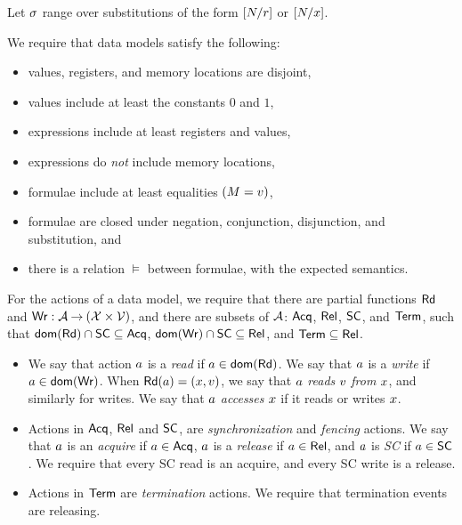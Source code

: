Let $\sigma$ range over substitutions of the form
$[N/r]$ or $[N/x]$.

We require that data models satisfy the following:
\begin{itemize}
\item values, registers, and memory locations are disjoint,
\item values include at least the constants $0$ and $1$,
\item expressions include at least registers and values,
\item expressions do \emph{not} include memory locations, %
\item formulae include at least %
  equalities %
  $(M=v)$, %
\item formulae are closed under negation, conjunction, disjunction, and
  substitution, and
\item there is a relation $\vDash$ between formulae, with the expected semantics.
\end{itemize}

For the actions of a data model, we require that
there are partial functions $\mathsf{Rd}$ and
$\mathsf{Wr}: \mathcal{A} \mathbin\rightarrow (\mathcal{X} \times \mathcal{V})$, and there are subsets of $\mathcal{A}$:
$\mathsf{Acq}$, $\mathsf{Rel}$, $\mathsf{SC}$, and $\mathsf{Term}$,
such that
$\mathsf{dom}(\mathsf{Rd})\cap\mathsf{SC}\subseteq\mathsf{Acq}$,
$\mathsf{dom}(\mathsf{Wr})\cap\mathsf{SC}\subseteq\mathsf{Rel}$, and
$\mathsf{Term}\subseteq\mathsf{Rel}$.

\begin{itemize}    
\item We say that action $a$ is a \emph{read} if
  $a\in\mathsf{dom}(\mathsf{Rd})$. We say that $a$ is a \emph{write} if
  $a\in\mathsf{dom}(\mathsf{Wr})$.  When $\mathsf{Rd}(a) = (x,v)$,
  we say that $a$ \emph{reads} $v$ \emph{from} $x$, and
  similarly for writes.  We say that $a$ \emph{accesses} $x$ if it
  reads or writes $x$.

\item Actions in $\mathsf{Acq}$, $\mathsf{Rel}$ and $\mathsf{SC}$, are \emph{synchronization} and
  \emph{fencing} actions.  We say that $a$ is an \emph{acquire} if
  $a\in\mathsf{Acq}$, $a$ is a \emph{release} if $a\in\mathsf{Rel}$, and
  $a$ is \emph{SC} if $a\in\mathsf{SC}$.  We require that every SC read is
  an acquire, and every SC write is a release.

  
\item Actions in $\mathsf{Term}$ are \emph{termination} actions. We
  require %
  that termination events are releasing.
\end{itemize}


